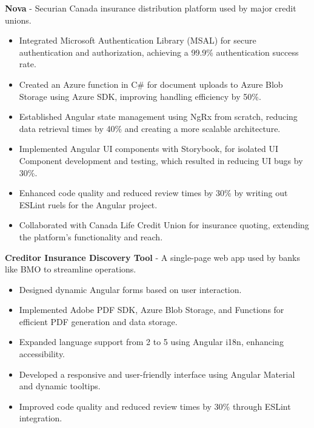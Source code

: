 \documentclass{article}
\begin{document}
\textbf{Nova} - Securian Canada insurance distribution platform used by major credit unions.
\vspace{-5pt}\begin{itemize}[leftmargin=15pt, itemsep=-5pt]
    \item Integrated Microsoft Authentication Library (MSAL) for secure authentication and authorization, achieving a 99.9\% authentication success rate.
    \item Created an Azure function in C\# for document uploads to Azure Blob Storage using Azure SDK, improving handling efficiency by 50\%.
    \item Established Angular state management using NgRx from scratch, reducing data retrieval times by 40\% and creating a more scalable architecture.
    \item Implemented Angular UI components with Storybook, for isolated UI Component development and testing, which resulted in reducing UI bugs by 30\%.
    \item Enhanced code quality and reduced review times by 30\% by writing out ESLint ruels for the Angular project.
    \item Collaborated with Canada Life Credit Union for insurance quoting, extending the platform's functionality and reach.
\end{itemize}

\textbf{Creditor Insurance Discovery Tool} - A single-page web app used by banks like BMO to streamline operations.
\vspace{-5pt}\begin{itemize}[leftmargin=15pt, itemsep=-5pt]
      \item Designed dynamic Angular forms based on user interaction.
      \item Implemented Adobe PDF SDK, Azure Blob Storage, and Functions for efficient PDF generation and data storage.
      \item Expanded language support from 2 to 5 using Angular i18n, enhancing accessibility.
      \item Developed a responsive and user-friendly interface using Angular Material and dynamic tooltips.
      \item Improved code quality and reduced review times by 30\% through ESLint integration.
\end{itemize}
\end{document}
